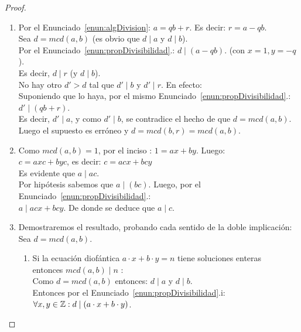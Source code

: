 \begin{proof}
\begin{enumerate}[label=\roman*)]
Para que la última igualdad se mantenga (\ref{eq351}), dado que $|b|$,$d > 0$, se deduce que $q > 0$, es decir: 
\[
 q \geq 1 \quad // \cdot d
\]
\[
qd \geq d
\]
Luego, aplicando (\ref{eq351}): 
$|b| \geq d$. Lo que contradice la ecuación (\ref{eq343}). 

Así, nuestro supuesto es errado y $mcd(0,b) = |b|$. 
\setcounter{enumi}{6}
\item Por el Enunciado~\ref{enun:algDivision}: $a = qb + r$. Es decir: $r = a - qb$. \\
Sea $d = mcd(a,b)$ (es obvio que $d \mid a$ y $d \mid b$). \\
\setcounter{enumi}{1}
Por el Enunciado~\ref{enun:propDivisibilidad}.: $d \mid (a - qb)$. (con $x = 1, y = -q$). \\ Es decir, $d \mid r$ (y $d \mid b$). \\
No hay otro $d' > d$ tal que $d' \mid b$ y $d' \mid r$. En efecto: \\
Suponiendo que lo haya, por el mismo Enunciado~\ref{enun:propDivisibilidad}.: \\
$d' \mid (qb + r)$. \\
Es decir, $d' \mid a$, y como $d' \mid b$, se contradice el hecho de que $d = mcd(a,b)$. \\
Luego el supuesto es erróneo y $d = mcd(b,r) = mcd(a,b)$.
\setcounter{enumi}{7}
\item \setcounter{enumi}{1}
Como $mcd(a,b) = 1$, por el inciso : $1 = ax + by$. Luego: \\
$c = axc + byc$, es decir: $ c = acx + bcy$ \\
Es evidente que $a \mid ac$. \\
Por hipótesis sabemos que $a \mid (bc)$. Luego, por el Enunciado~\ref{enun:propDivisibilidad}.: \\
$ a \mid acx + bcy$. De donde se deduce que $a \mid c$.
\setcounter{enumi}{8}
\item Demostraremos el resultado, probando cada sentido de la doble implicación: \\
Sea $d=mcd(a,b)$.
\begin{enumerate}
\item Si la ecuación diofántica $a \cdot x+b \cdot y=n$ tiene soluciones enteras\\
entonces $mcd(a,b) \mid n$ :\\
Como $d=mcd(a,b)$ entonces: $d \mid a$ y $d \mid b$.\\
Entonces por el Enunciado~\ref{enun:propDivisibilidad}.i: $\forall x,y \in \mathbb{Z}: d \mid(a \cdot x+b \cdot y)$.\\

\end{enumerate}
\end{enumerate}
\end{proof}
